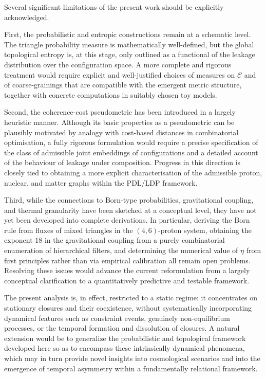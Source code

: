 \documentclass[11pt,a4paper]{article}
\theoremstyle{definition}
\newcommand{\etaL}{\eta} %
\newcommand{\Cconf}{\mathcal{C}} %
\begin{document}
Several significant limitations of the present work should be explicitly acknowledged.  

First, the probabilistic and entropic constructions remain at a schematic level. The triangle probability measure is mathematically well-defined, but the global topological entropy is, at this stage, only outlined as a functional of the leakage distribution over the configuration space. A more complete and rigorous treatment would require explicit and well-justified choices of measures on \(\Cconf\) and of coarse-grainings that are compatible with the emergent metric structure, together with concrete computations in suitably chosen toy models.

Second, the coherence-cost pseudometric has been introduced in a largely heuristic manner. Although its basic properties as a pseudometric can be plausibly motivated by analogy with cost-based distances in combinatorial optimisation, a fully rigorous formulation would require a precise specification of the class of admissible joint embeddings of configurations and a detailed account of the behaviour of leakage under composition. Progress in this direction is closely tied to obtaining a more explicit characterisation of the admissible proton, nuclear, and matter graphs within the PDL/LDP framework.

Third, while the connections to Born-type probabilities, gravitational coupling, and thermal granularity have been sketched at a conceptual level, they have not yet been developed into complete derivations. In particular, deriving the Born rule from fluxes of mixed triangles in the \((4,6)\)-proton system, obtaining the exponent \(18\) in the gravitational coupling from a purely combinatorial enumeration of hierarchical filters, and determining the numerical value of \(\etaL\) from first principles rather than via empirical calibration all remain open problems. Resolving these issues would advance the current reformulation from a largely conceptual clarification to a quantitatively predictive and testable framework.

The present analysis is, in effect, restricted to a static regime: it concentrates on stationary closures and their coexistence, without systematically incorporating dynamical features such as constraint events, genuinely non-equilibrium processes, or the temporal formation and dissolution of closures. A natural extension would be to generalize the probabilistic and topological framework developed here so as to encompass these intrinsically dynamical phenomena, which may in turn provide novel insights into cosmological scenarios and into the emergence of temporal asymmetry within a fundamentally relational framework.
\end{document}
